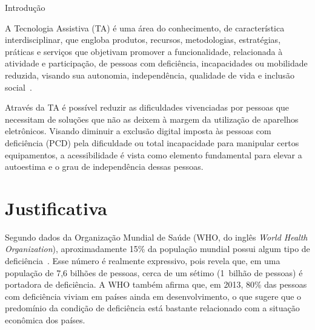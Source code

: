 \begin{chapter}{Introdução}

A Tecnologia Assistiva (TA) é uma área do conhecimento, de característica
interdisciplinar, que engloba produtos, recursos, metodologias, estratégias,
práticas e serviços que objetivam promover a funcionalidade, relacionada à
atividade e participação, de pessoas com deficiência, incapacidades ou
mobilidade reduzida, visando sua autonomia, independência, qualidade de vida e
inclusão social~\cite{cat09}.

Através da TA é possível reduzir as dificuldades vivenciadas por pessoas que
necessitam de soluções que não as deixem à margem da utilização de aparelhos
eletrônicos. Visando diminuir a exclusão digital imposta às pessoas com
deficiência (PCD) pela dificuldade ou total incapacidade para manipular certos
equipamentos, a acessibilidade é vista como elemento fundamental para elevar a
autoestima e o grau de independência dessas pessoas.

\section{Justificativa}

Segundo dados da Organização Mundial de Saúde (WHO, do inglês \textit{World
Health Organization}), aproximadamente 15\% da população mundial possui algum
tipo de deficiência~\cite{WHO15}. Esse número é realmente expressivo, pois
revela que, em uma população de 7,6 bilhões de pessoas, cerca de um sétimo
(1~bilhão de pessoas) é portadora de deficiência. A WHO também afirma que, em
2013, 80\% das pessoas com deficiência viviam em países ainda em
desenvolvimento, o que sugere que o predomínio da condição de deficiência está
bastante relacionado com a situação econômica dos países.


\end{chapter}
